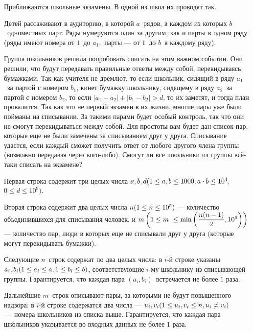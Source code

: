 
Приближаются школьные экзамены. В одной из школ их проводят так.

Детей рассаживают в аудиторию, в которой $a$ рядов, в каждом из которых $b$ одноместных парт. Ряды нумеруются один за другим, как и парты в одном ряду (ряды имеют номера от $1$ до $a_1$, парты — от $1$ до $b$ в каждому ряду). 

Группа школьников решила попробовать списать на этом важном событии. Они решили, что будут передавать правильные ответы между собой, перекидываясь бумажками. Так как учителя не дремлют, то если школьник, сидящий в ряду $a_1$ за партой с номером $b_1$, кинет бумажку школьнику, сидящему в ряду $a_2$ за партой с номером $b_2$, то если $\left|a_1-a_2\right| + \left|b_1-b_2\right| > d$, то их заметят, и тогда план провалится. Так как это не первый экзамен в их жизни, многие пары уже были пойманы на списывании. За такими парами будет особый контроль, так что они не смогут перекидываться между собой. Для простоты вам будет дан список пар, которые еще не были замечены за списыванием друг у друга. Списывание удастся, если каждый сможет получить ответ от любого другого члена группы (возможно передавая через кого-либо). Смогут ли все школьники из группы всё-таки списать на экзамене?


Первая строка содержит три целых числа $a, b, d\space (1\leq a, b\leq 1000,\space a\cdot b \leq 10^4,$ \linebreak $0\leq d\leq 10^9)$.

Вторая строка содержит два целых числа $n\space(1\leq n \leq 10^5)$ — количество объединившихся для списывания человек, и $m\space\left(1\leq m \leq \min{\left(\dfrac{n(n-1)}{2}, 10^6\right)}\right)$ — количество пар, люди в которых еще не списывали друг у друга (которые могут перекидывать бумажки).

Следующие $n$ строк содержат по два целых числа: в $i$-й строке указаны \linebreak $a_i, b_i\space(1\leq a_i\leq a,\space 1\leq b_i\leq b)$, соответствующие $i$-му школьнику из списывающей группы. Гарантируется, что каждая пара $\left(a_i, b_i\right)$ встречается не более $1$ раза.

Дальнейшие $m$ строк описывают пары, за которыми не будут повышенного надзора: в $i$-й строке содержатся два числа — $u_i, v_i\space (1\leq u_i, v_i \leq n, \space u_i \neq v_i)$ — номера школьников из списка выше. Гарантируется, что каждая пара школьников указывается во входных данных не более $1$ раза.

